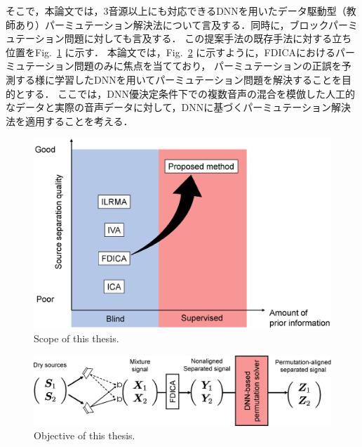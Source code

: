 そこで，本論文では，3音源以上にも対応できるDNNを用いたデータ駆動型（教師あり）パーミュテーション解決法について言及する．同時に，ブロックパーミュテーション問題に対しても言及する．
この提案手法の既存手法に対する立ち位置をFig.~\ref{fig:scope} に示す．
本論文では，Fig.~\ref{fig:topic} に示すように，FDICAにおけるパーミュテーション問題のみに焦点を当てており，
パーミュテーションの正誤を予測する様に学習したDNNを用いてパーミュテーション問題を解決することを目的とする．
ここでは，DNN優決定条件下での複数音声の混合を模倣した人工的なデータと実際の音声データに対して，DNNに基づくパーミュテーション解決法を適用することを考える．

\begin{figure}[t]
    \vspace{4pt}
    \begin{center}
        \includegraphics[width=1.16\columnwidth]{figures/scope.eps}
    \end{center}
    \vspace{-8pt}
	\caption{Scope of this thesis.}
	\label{fig:scope}
\end{figure}

\begin{figure}[h]
    \vspace{4pt}
    \begin{center}
        \includegraphics[width=0.9\columnwidth]{figures/topic.eps}
    \end{center}
    \vspace{-8pt}
	\caption{Objective of this thesis.}
	\label{fig:topic}
\end{figure}


